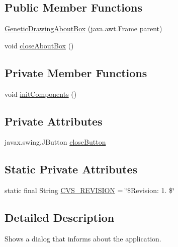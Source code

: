 \subsection*{Public Member Functions}
\begin{DoxyCompactItemize}
\item 
\hyperlink{classexamples_1_1monalisa_1_1gui_1_1_genetic_drawing_about_box_a5a351b028c454aba0407792378ac2b74}{Genetic\-Drawing\-About\-Box} (java.\-awt.\-Frame parent)
\item 
void \hyperlink{classexamples_1_1monalisa_1_1gui_1_1_genetic_drawing_about_box_abbc40031bb3be14e2349e6ccd031c7f5}{close\-About\-Box} ()
\end{DoxyCompactItemize}
\subsection*{Private Member Functions}
\begin{DoxyCompactItemize}
\item 
void \hyperlink{classexamples_1_1monalisa_1_1gui_1_1_genetic_drawing_about_box_a3637a447238f197efb5ca8381957e0f6}{init\-Components} ()
\end{DoxyCompactItemize}
\subsection*{Private Attributes}
\begin{DoxyCompactItemize}
\item 
javax.\-swing.\-J\-Button \hyperlink{classexamples_1_1monalisa_1_1gui_1_1_genetic_drawing_about_box_abb14e6c034140c5f411b2c32d2983bfc}{close\-Button}
\end{DoxyCompactItemize}
\subsection*{Static Private Attributes}
\begin{DoxyCompactItemize}
\item 
static final String \hyperlink{classexamples_1_1monalisa_1_1gui_1_1_genetic_drawing_about_box_acf1e5dd90b4900deb131719cd0c59b89}{C\-V\-S\-\_\-\-R\-E\-V\-I\-S\-I\-O\-N} = \char`\"{}\$Revision\-: 1. \$\char`\"{}
\end{DoxyCompactItemize}


\subsection{Detailed Description}
Shows a dialog that informs about the application.

